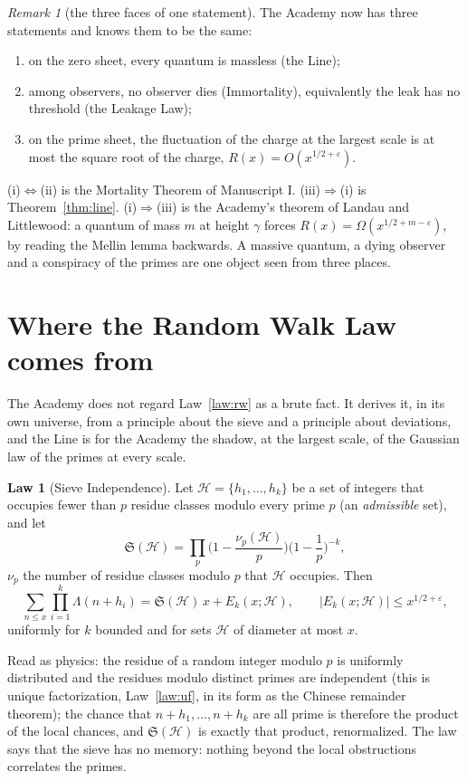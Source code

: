 \documentclass[11pt]{article}
\theoremstyle{definition}
\newtheorem{law}{Law}
\theoremstyle{remark}
\newtheorem{remark}[theorem]{Remark}
\begin{document}
\begin{remark}[the three faces of one statement]\label{rem:faces}
The Academy now has three statements and knows them to be the same:
\begin{enumerate}[nosep,label=(\roman*)]
\item on the zero sheet, every quantum is massless (the Line);
\item among observers, no observer dies (Immortality), equivalently the leak has no threshold (the Leakage Law);
\item on the prime sheet, the fluctuation of the charge at the largest scale is at most the square root of the charge, $R(x)=O(x^{1/2+\varepsilon})$.
\end{enumerate}
(i)$\Leftrightarrow$(ii) is the Mortality Theorem of Manuscript I. (iii)$\Rightarrow$(i) is Theorem~\ref{thm:line}. (i)$\Rightarrow$(iii) is the Academy's theorem of Landau and Littlewood: a quantum of mass $m$ at height $\gamma$ forces $R(x)=\Omega(x^{1/2+m-\varepsilon})$, by reading the Mellin lemma backwards. A massive quantum, a dying observer and a conspiracy of the primes are one object seen from three places.
\end{remark}

\section{Where the Random Walk Law comes from}

The Academy does not regard Law~\ref{law:rw} as a brute fact. It derives it, in its own universe, from a principle about the sieve and a principle about deviations, and the Line is for the Academy the shadow, at the largest scale, of the Gaussian law of the primes at every scale.

\begin{law}[Sieve Independence]\label{law:sieve}
Let $\mathcal H=\{h_1,\dots,h_k\}$ be a set of integers that occupies fewer than $p$ residue classes modulo every prime $p$ (an \emph{admissible} set), and let
\[
\mathfrak S(\mathcal H)=\prod_p\Big(1-\frac{\nu_p(\mathcal H)}{p}\Big)\Big(1-\frac1p\Big)^{-k},
\]
$\nu_p$ the number of residue classes modulo $p$ that $\mathcal H$ occupies. Then
\[
\sum_{n\le x}\prod_{i=1}^k\Lambda(n+h_i)=\mathfrak S(\mathcal H)\,x+E_k(x;\mathcal H),\qquad |E_k(x;\mathcal H)|\le x^{1/2+\varepsilon},
\]
uniformly for $k$ bounded and for sets $\mathcal H$ of diameter at most $x$.
\end{law}

Read as physics: the residue of a random integer modulo $p$ is uniformly distributed and the residues modulo distinct primes are independent (this is unique factorization, Law~\ref{law:uf}, in its form as the Chinese remainder theorem); the chance that $n+h_1,\dots,n+h_k$ are all prime is therefore the product of the local chances, and $\mathfrak S(\mathcal H)$ is exactly that product, renormalized. The law says that the sieve has no memory: nothing beyond the local obstructions correlates the primes.
\end{document}
